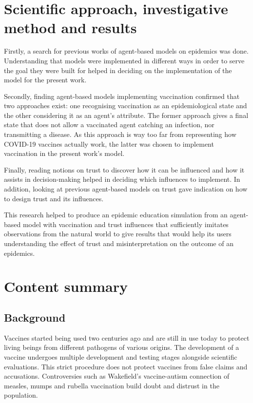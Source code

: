 \section{Scientific approach, investigative method and results}

Firstly, a search for previous works of agent-based models on epidemics was done. Understanding that models were implemented in different ways in order to serve the goal they were built for helped in deciding on the implementation of the model for the present work.

Secondly, finding agent-based models implementing vaccination confirmed that two approaches exist: one recognising vaccination as an epidemiological state and the other considering it as an agent's attribute. The former approach gives a final state that does not allow a vaccinated agent catching an infection, nor transmitting a disease. As this approach is way too far from representing how COVID-19 vaccines actually work, the latter was chosen to implement vaccination in the present work's model.

Finally, reading notions on trust to discover how it can be influenced and how it assists in decision-making helped in deciding which influences to implement. In addition, looking at previous agent-based models on trust gave indication on how to design trust and its influences.

This research helped to produce an epidemic education simulation from an agent-based model with vaccination and trust influences that sufficiently imitates observations from the natural world to give results that would help its users understanding the effect of trust and misinterpretation on the outcome of an epidemics.



\section{Content summary}
\label{content_summary}

\subsection{Background}

Vaccines started being used two centuries ago and are still in use today to protect living beings from different pathogens of various origins. The development of a vaccine undergoes multiple development and testing stages alongside scientific evaluations. This strict procedure does not protect vaccines from false claims and accusations. Controversies such as Wakefield's vaccine-autism connection of measles, mumps and rubella vaccination build doubt and distrust in the population.

